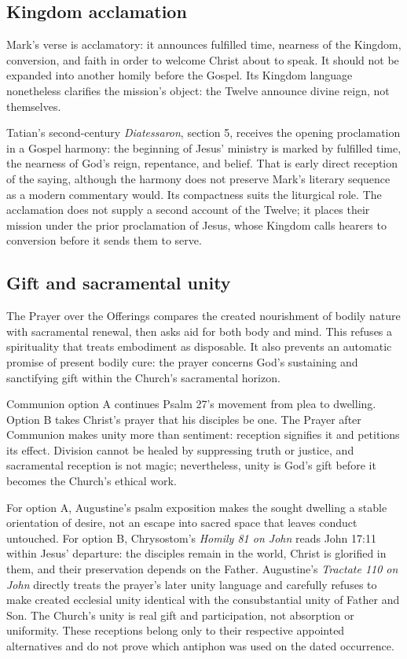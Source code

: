 \begin{deepstudy}
\subsection*{Kingdom acclamation\enspace{}}

Mark's verse is acclamatory: it announces fulfilled time, nearness of the Kingdom, conversion, and faith in order to welcome Christ about to speak. It should not be expanded into another homily before the Gospel. Its Kingdom language nonetheless clarifies the mission's object: the Twelve announce divine reign, not themselves.

Tatian's second-century \emph{Diatessaron}, section 5, receives the opening proclamation in a Gospel harmony: the beginning of Jesus' ministry is marked by fulfilled time, the nearness of God's reign, repentance, and belief. That is early direct reception of the saying, although the harmony does not preserve Mark's literary sequence as a modern commentary would. Its compactness suits the liturgical role. The acclamation does not supply a second account of the Twelve; it places their mission under the prior proclamation of Jesus, whose Kingdom calls hearers to conversion before it sends them to serve.

\subsection*{Gift and sacramental unity\enspace{}}

The Prayer over the Offerings compares the created nourishment of bodily nature with sacramental renewal, then asks aid for both body and mind. This refuses a spirituality that treats embodiment as disposable. It also prevents an automatic promise of present bodily cure: the prayer concerns God's sustaining and sanctifying gift within the Church's sacramental horizon.

Communion option A continues Psalm 27's movement from plea to dwelling. Option B takes Christ's prayer that his disciples be one. The Prayer after Communion makes unity more than sentiment: reception signifies it and petitions its effect. Division cannot be healed by suppressing truth or justice, and sacramental reception is not magic; nevertheless, unity is God's gift before it becomes the Church's ethical work.

For option A, Augustine's psalm exposition makes the sought dwelling a stable orientation of desire, not an escape into sacred space that leaves conduct untouched. For option B, Chrysostom's \emph{Homily 81 on John} reads John 17:11 within Jesus' departure: the disciples remain in the world, Christ is glorified in them, and their preservation depends on the Father. Augustine's \emph{Tractate 110 on John} directly treats the prayer's later unity language and carefully refuses to make created ecclesial unity identical with the consubstantial unity of Father and Son. The Church's unity is real gift and participation, not absorption or uniformity. These receptions belong only to their respective appointed alternatives and do not prove which antiphon was used on the dated occurrence.


\end{deepstudy}

